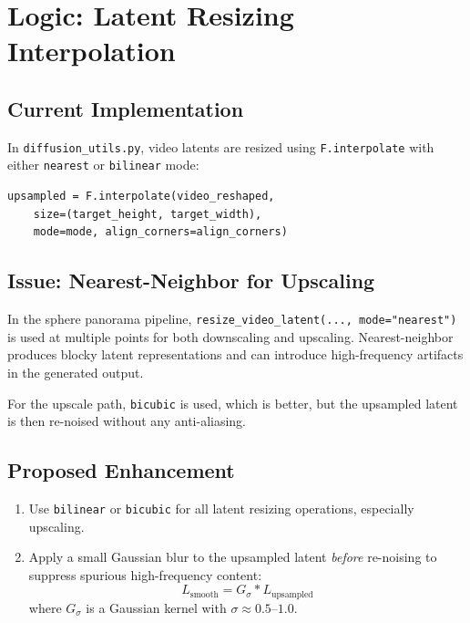 \documentclass[11pt,a4paper]{article}
\newcommand{\file}[1]{\texttt{#1}}
\newcommand{\fn}[1]{\texttt{#1}}
\begin{document}
\section{Logic: Latent Resizing Interpolation}

\subsection{Current Implementation}

In \file{diffusion\_utils.py}, video latents are resized using \fn{F.interpolate} with either \texttt{nearest} or \texttt{bilinear} mode:
\begin{lstlisting}
upsampled = F.interpolate(video_reshaped,
    size=(target_height, target_width),
    mode=mode, align_corners=align_corners)
\end{lstlisting}

\subsection{Issue: Nearest-Neighbor for Upscaling}

In the sphere panorama pipeline, \fn{resize\_video\_latent(..., mode="nearest")} is used at multiple points for both downscaling and upscaling.
Nearest-neighbor produces blocky latent representations and can introduce high-frequency artifacts in the generated output.

For the upscale path, \texttt{bicubic} is used, which is better, but the upsampled latent is then re-noised without any anti-aliasing.

\subsection{Proposed Enhancement}

\begin{enumerate}
    \item Use \texttt{bilinear} or \texttt{bicubic} for all latent resizing operations, especially upscaling.
    \item Apply a small Gaussian blur to the upsampled latent \emph{before} re-noising to suppress spurious high-frequency content:
\begin{equation}
    L_{\text{smooth}} = G_\sigma * L_{\text{upsampled}}
\end{equation}
where $G_\sigma$ is a Gaussian kernel with $\sigma \approx 0.5$--$1.0$.
\end{enumerate}
\end{document}
